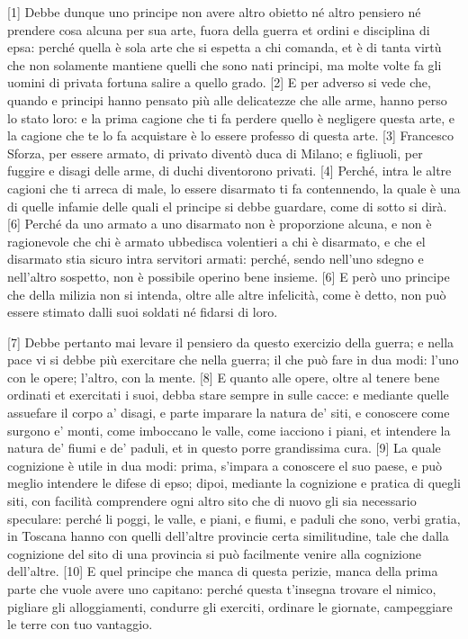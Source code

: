 {[}1{]} Debbe dunque uno principe non avere altro obietto né altro
pensiero né prendere cosa alcuna per sua arte, fuora della guerra et
ordini e disciplina di epsa: perché quella è sola arte che si espetta a
chi comanda, et è di tanta virtù che non solamente mantiene quelli che
sono nati principi, ma molte volte fa gli uomini di privata fortuna
salire a quello grado. {[}2{]} E per adverso si vede che, quando e
principi hanno pensato più alle delicatezze che alle arme, hanno perso
lo stato loro: e la prima cagione che ti fa perdere quello è negligere
questa arte, e la cagione che te lo fa acquistare è lo essere professo
di questa arte. {[}3{]} Francesco Sforza, per essere armato, di privato
diventò duca di Milano; e figliuoli, per fuggire e disagi delle arme, di
duchi diventorono privati. {[}4{]} Perché, intra le altre cagioni che ti
arreca di male, lo essere disarmato ti fa contennendo, la quale è una di
quelle infamie delle quali el principe si debbe guardare, come di sotto
si dirà. {[}6{]} Perché da uno armato a uno disarmato non è proporzione
alcuna, e non è ragionevole che chi è armato ubbedisca volentieri a chi
è disarmato, e che el disarmato stia sicuro intra servitori armati:
perché, sendo nell'uno sdegno e nell'altro sospetto, non è possibile
operino bene insieme. {[}6{]} E però uno principe che della milizia non
si intenda, oltre alle altre infelicità, come è detto, non può essere
stimato dalli suoi soldati né fidarsi di loro.

{[}7{]} Debbe pertanto mai levare il pensiero da questo exercizio della
guerra; e nella pace vi si debbe più exercitare che nella guerra; il che
può fare in dua modi: l'uno con le opere; l'altro, con la mente. {[}8{]}
E quanto alle opere, oltre al tenere bene ordinati et exercitati i suoi,
debba stare sempre in sulle cacce: e mediante quelle assuefare il corpo
a' disagi, e parte imparare la natura de' siti, e conoscere come surgono
e' monti, come imboccano le valle, come iacciono i piani, et intendere
la natura de' fiumi e de' paduli, et in questo porre grandissima cura.
{[}9{]} La quale cognizione è utile in dua modi: prima, s'impara a
conoscere el suo paese, e può meglio intendere le difese di epso; dipoi,
mediante la cognizione e pratica di quegli siti, con facilità
comprendere ogni altro sito che di nuovo gli sia necessario speculare:
perché li poggi, le valle, e piani, e fiumi, e paduli che sono, verbi
gratia, in Toscana hanno con quelli dell'altre provincie certa
similitudine, tale che dalla cognizione del sito di una provincia si può
facilmente venire alla cognizione dell'altre. {[}10{]} E quel principe
che manca di questa perizie, manca della prima parte che vuole avere uno
capitano: perché questa t'insegna trovare el nimico, pigliare gli
alloggiamenti, condurre gli exerciti, ordinare le giornate, campeggiare
le terre con tuo vantaggio.

